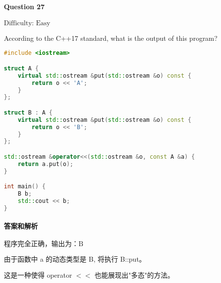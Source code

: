 \documentclass{article}
\begin{document}
	\paragraph*{Question 27} $\boxed{\text{Difficulty: Easy}} $			
	
	According to the C++17 standard, what is the output of this program?
	
	\begin{lstlisting}[language=C++]  		
#include <iostream>

struct A {
	virtual std::ostream &put(std::ostream &o) const {
		return o << 'A';
	}
};

struct B : A {
	virtual std::ostream &put(std::ostream &o) const {
		return o << 'B';
	}
};

std::ostream &operator<<(std::ostream &o, const A &a) {
	return a.put(o);
}

int main() {
	B b;
	std::cout << b;
}
	\end{lstlisting}
	
	\paragraph*{答案和解析} $\boxed{\text{程序完全正确，输出为：B}} $
	
	由于函数中 a 的动态类型是 B, 将执行 B::put。
	
	这是一种使得 operator $<<$ 也能展现出"多态"的方法。 
\end{document}
